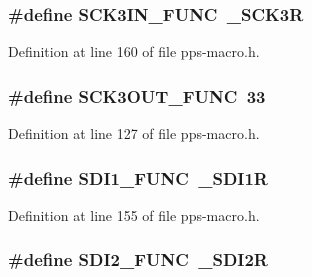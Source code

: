 \subsubsection[{S\+C\+K3\+I\+N\+\_\+\+F\+U\+N\+C}]{\setlength{\rightskip}{0pt plus 5cm}\#define S\+C\+K3\+I\+N\+\_\+\+F\+U\+N\+C~\+\_\+\+S\+C\+K3\+R}\label{pps-macro_8h_aa7f6e1bb8768fc55aae9764646082148}


Definition at line 160 of file pps-\/macro.\+h.

\hypertarget{pps-macro_8h_a2baee3bab2ed070c25bdcd6d7d47d0d0}{}
\subsubsection[{S\+C\+K3\+O\+U\+T\+\_\+\+F\+U\+N\+C}]{\setlength{\rightskip}{0pt plus 5cm}\#define S\+C\+K3\+O\+U\+T\+\_\+\+F\+U\+N\+C~33}\label{pps-macro_8h_a2baee3bab2ed070c25bdcd6d7d47d0d0}


Definition at line 127 of file pps-\/macro.\+h.

\hypertarget{pps-macro_8h_aead867220c643b18f9797b2d8cdf228f}{}
\subsubsection[{S\+D\+I1\+\_\+\+F\+U\+N\+C}]{\setlength{\rightskip}{0pt plus 5cm}\#define S\+D\+I1\+\_\+\+F\+U\+N\+C~\+\_\+\+S\+D\+I1\+R}\label{pps-macro_8h_aead867220c643b18f9797b2d8cdf228f}


Definition at line 155 of file pps-\/macro.\+h.

\hypertarget{pps-macro_8h_a48c42f0763d4b12aa194304310c6f316}{}
\subsubsection[{S\+D\+I2\+\_\+\+F\+U\+N\+C}]{\setlength{\rightskip}{0pt plus 5cm}\#define S\+D\+I2\+\_\+\+F\+U\+N\+C~\+\_\+\+S\+D\+I2\+R}\label{pps-macro_8h_a48c42f0763d4b12aa194304310c6f316}


